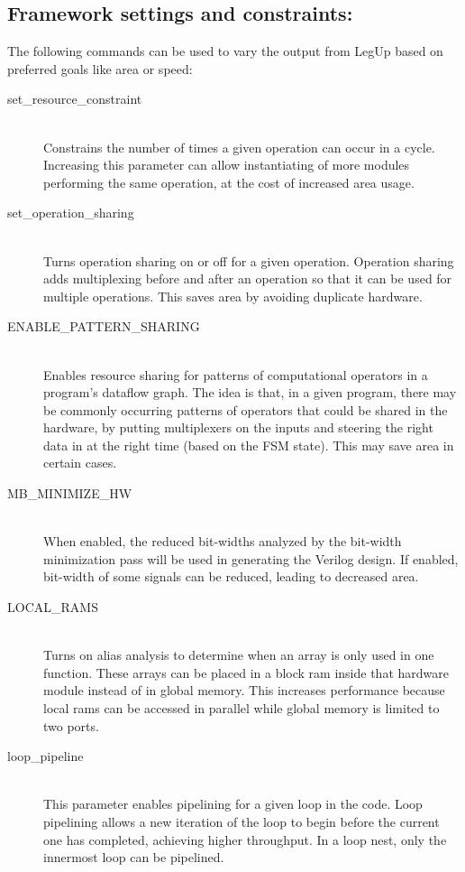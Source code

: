 \subsection{Framework settings and constraints:}
The following commands can be used to vary the output from LegUp based on preferred goals like area or speed:
\begin{description}
  \item[set\_resource\_constraint] \hfill \\
      Constrains the number of times a given operation can occur in a cycle. Increasing this parameter can allow instantiating of more modules performing the same operation, at the cost of increased area usage. 
  \item[set\_operation\_sharing] \hfill \\
      Turns operation sharing on or off for a given operation. Operation sharing adds multiplexing before and after an operation so that it can be used for multiple operations. This saves area by avoiding duplicate hardware.
  \item[ENABLE\_PATTERN\_SHARING] \hfill \\
      Enables resource sharing for patterns of computational operators in a program’s dataflow graph. The idea is that, in a given program, there may be commonly occurring patterns of operators that could be shared in the hardware, by putting multiplexers on the inputs and steering the right data in at the right time (based on the FSM state). This may save area in certain cases. \cite{hadjis2012impact}
  \item[MB\_MINIMIZE\_HW] \hfill \\
      When enabled, the reduced bit-widths analyzed by the bit-width minimization pass will be used in generating the Verilog design. If enabled, bit-width of some signals can be reduced, leading to decreased area.
  \item[LOCAL\_RAMS] \hfill \\
      Turns on alias analysis to determine when an array is only used in one function. These arrays can be placed in a block ram inside that hardware module instead of in global memory. This increases performance because local rams can be accessed in parallel while global memory is limited to two ports.
  \item[loop\_pipeline] \hfill \\
     This parameter enables pipelining for a given loop in the code. Loop pipelining allows a new iteration of the loop to begin before the current one has completed, achieving higher throughput. In a loop nest, only the innermost loop can be pipelined.
\end{description}
